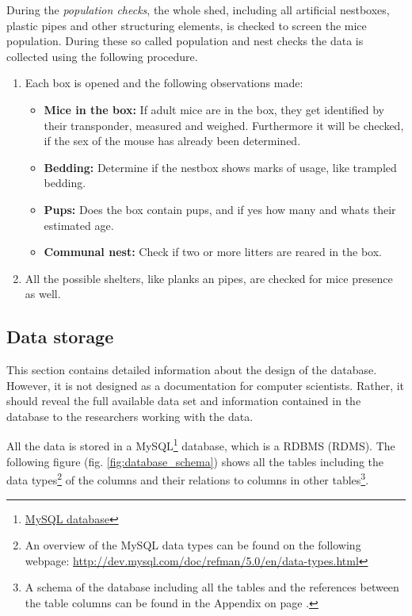 During the \textit{population checks}, the whole shed, including all artificial nestboxes, plastic pipes and other structuring elements, is checked to screen the mice population. During these so called population and nest checks the data is collected using the following procedure.

\begin{enumerate} 
	\item Each box is opened and the following observations made:
	\begin{itemize}
      \item \textbf{Mice in the box:} If adult mice are in the box, they get identified by their transponder, measured and weighed. Furthermore it will be checked, if the sex of the mouse has already been determined.  
      \item \textbf{Bedding:} Determine if the nestbox shows marks of usage, like trampled bedding.
      \item \textbf{Pups:} Does the box contain pups, and if yes how many and whats their estimated age. 
      \item \textbf{Communal nest:} Check if two or more litters are reared in the box. 
    \end{itemize}
	\item All the possible shelters, like planks an pipes, are checked for mice presence as well.
\end{enumerate}

\subsection{Data storage}
\label{subsec:datastorage}

This section contains detailed information about the design of the database. However, it is not designed as a documentation for computer scientists. Rather, it should reveal the full available data set and information contained in the database to the researchers working with the data.   

All the data is stored in a MySQL\footnote{\href{http://www.mysql.com/}{MySQL database}} database, which is  a \acf{RDBMS} (RDMS). The following figure (fig. \ref{fig:database_schema}) shows all the tables including the data types\footnote{An overview of the MySQL data types can be found on the following webpage: \url{http://dev.mysql.com/doc/refman/5.0/en/data-types.html}} of the columns and their relations to columns in other tables\footnote{A schema of the database including all the tables and the references between the table columns can be found in the Appendix on page \pageref{fig:database_schema}.}. 


